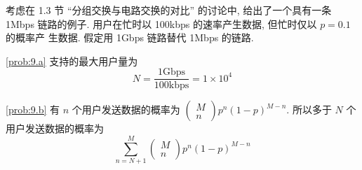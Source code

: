 \documentclass[boxes]{homework}
\begin{document}
\begin{problem}
考虑在 1.3 节 ``分组交换与电路交换的对比'' 的讨论中, 给出了一个具有一条 1Mbps
链路的例子. 用户在忙时以 100kbps 的速率产生数据, 但忙时仅以 $p = 0.1$ 的概率产
生数据. 假定用 1Gbps 链路替代 1Mbps 的链路.
\end{problem}
\begin{solution}
    \ref{prob:9.a} 支持的最大用户量为
    \begin{equation}
        N = \frac{ 1\text{Gbps} }{ 100\text{kbps} } = 1 \times 10^{4}
    \end{equation}

    \ref{prob:9.b} 有 $n$ 个用户发送数据的概率为
    $\begin{pmatrix}M \\ n\end{pmatrix} p^{n} {\left( 1 - p\right)}^{M - n}$.
    所以多于 $N$ 个用户发送数据的概率为
    \begin{equation}
        \sum_{n = N + 1}^{M}
        \begin{pmatrix}
            M \\
            n
        \end{pmatrix}
        p^{n} {\left( 1 - p\right)}^{M - n}
    \end{equation}
\end{solution}
\end{document}
